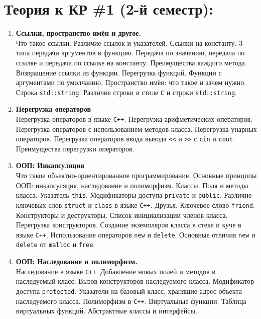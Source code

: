 \documentclass{article}
\begin{document}

\section*{Теория к КР \#1 (2-й семестр):}
\begin{enumerate}

\item  \textbf{Ссылки, пространство имён и другое.}\\
Что такое ссылки.  Различие ссылок и указателей. Ссылки на константу. 3 типа передачи аргументов в функцию. Передача по значению, передача по ссылке и передача по ссылке на константу. Преимущества каждого метода. Возвращение ссылки из функции. Перегрузка функций. Функции с аргументами по умолчанию. Пространство имён: что такое и зачем нужно. Строка \texttt{std::string}. Различие строки в стиле \texttt{C} и строки \texttt{std::string}.\\

\item \textbf{Перегрузка операторов}\\
Перегрузка операторов в языке \texttt{C++}. Перегрузка арифметических операторов. Перегрузка операторов с использованием методов класса. Перегрузка унарных операторов. Перегрузка операторов ввода вывода \verb|<<| и \verb|>>| с \texttt{cin} и \texttt{cout}. Преимущества перегрузки операторов.\\

\item  \textbf{ООП: Инкапсуляция}\\
Что такое объектно-ориентированное программирование. Основные принципы ООП: инкапсуляция, наследование и полиморфизм. Классы. Поля и методы класса. Указатель \texttt{this}. Модификаторы доступа \texttt{private} и \texttt{public}.   Различие ключевых слов \texttt{struct} и \texttt{class} в языке \texttt{C++}. Друзья. Ключевое слово \texttt{friend}. Конструкторы и деструкторы. Список инициализации членов класса. Перегрузка конструкторов. Создание экземпляров класса в стеке и куче в языке \texttt{C++}. Использование операторов \texttt{new} и \texttt{delete}. Основные отличия \texttt{new} и \texttt{delete} от \texttt{malloc} и \texttt{free}.
\\

\item \textbf{ООП: Наследование и полиморфизм.}\\
Наследование в языке \texttt{C++}. Добавление новых полей и методов в наследуемый класс. Вызов конструкторов наследуемого класса. Модификатор доступа \texttt{protected}. Указатели на базовый класс, хранящие адрес объекта наследуемого класса. Полиморфизм в \texttt{C++}. Виртуальные функции. Таблица виртуальных функций. Абстрактные классы и интерфейсы. \\



\end{enumerate}
\end{document}
